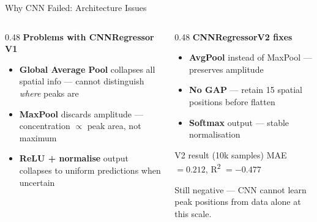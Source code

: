 \begin{frame}{Why CNN Failed: Architecture Issues}
    \begin{columns}[t]
        \begin{column}{0.48\textwidth}
            \textbf{Problems with CNNRegressor V1}
            \begin{itemize}
                \item \textbf{Global Average Pool} collapses all spatial info — cannot distinguish \textit{where} peaks are
                \item \textbf{MaxPool} discards amplitude — concentration $\propto$ peak area, not maximum
                \item \textbf{ReLU + normalise} output collapses to uniform predictions when uncertain
            \end{itemize}
        \end{column}
        \begin{column}{0.48\textwidth}
            \textbf{CNNRegressorV2 fixes}
            \begin{itemize}
                \item \textbf{AvgPool} instead of MaxPool — preserves amplitude
                \item \textbf{No GAP} — retain 15 spatial positions before flatten
                \item \textbf{Softmax} output — stable normalisation
            \end{itemize}
            \vspace{0.3cm}
            \begin{block}{V2 result (10k samples)}
                MAE $= 0.212$, R\textsuperscript{2} $= -0.477$
            \end{block}
            \small Still negative — CNN cannot learn peak positions from data alone at this scale.
        \end{column}
    \end{columns}
\end{frame}

